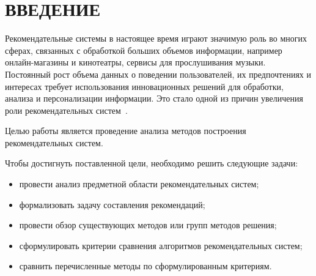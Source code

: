 \chapter*{ВВЕДЕНИЕ}

Рекомендательные системы в настоящее
время играют значимую роль во многих сферах, связанных
с обработкой больших объемов информации, например
онлайн-магазины и кинотеатры, сервисы для прослушивания музыки.
Постоянный рост объема данных о поведении пользователей, их предпочтениях и интересах
требует использования инновационных решений для обработки, анализа и персонализации информации.
Это стало одной из причин увеличения роли рекомендательных систем~\cite{obzor_methods}.

Целью работы является проведение анализа методов построения рекомендательных систем.

Чтобы достигнуть поставленной цели, необходимо решить следующие задачи:
\begin{itemize}
\item провести анализ предметной области рекомендательных систем;
\item формализовать задачу составления рекомендаций;
\item провести обзор существующих методов или групп методов решения;
\item сформулировать критерии сравнения алгоритмов рекомендательных систем;
\item сравнить перечисленные методы по сформулированным критериям.
\end{itemize}

